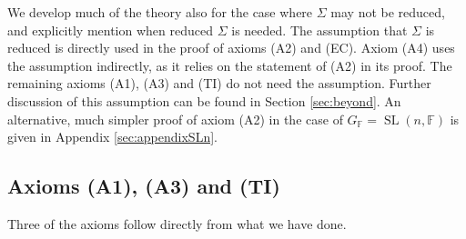 \documentclass[12pt]{amsart}
\newcommand{\F}{\mathbb{F} }
\numberwithin{equation}{section}
\theoremstyle{remark} %
\begin{document}
 We develop much of the theory also for the case where $\Sigma$ may not be reduced, and explicitly mention when reduced $\Sigma$ is needed.
 The assumption that $\Sigma$ is reduced is directly used in the proof of axioms (A2) and (EC). Axiom (A4) uses the assumption indirectly, as it relies on the statement of (A2) in its proof. The remaining axioms (A1), (A3) and (TI) do not need the assumption. Further discussion of this assumption can be found in Section \ref{sec:beyond}.
 An alternative, much simpler proof of axiom (A2) in the case of $G_\F = \operatorname{SL}(n,\F)$ is given in Appendix \ref{sec:appendixSLn}. 



\subsection{Axioms (A1), (A3) and (TI)}\label{sec:axiomsA1A3TI}

Three of the axioms follow directly from what we have done.
\end{document}
